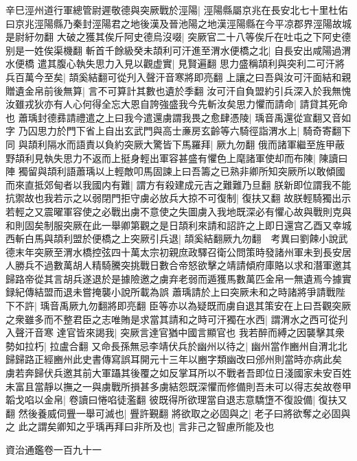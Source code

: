 辛巳涇州道行軍總管尉遲敬德與突厥戰於涇陽|{
	涇陽縣屬京兆在長安北七十里杜佑曰京兆涇陽縣乃秦封涇陽君之地後漢及晉池陽之地漢涇陽縣在今平凉郡界涇陽故城是尉紆勿翻}
大破之獲其俟斤阿史德烏沒啜|{
	突厥官二十八等俟斤在吐屯之下阿史德别是一姓俟渠機翻}
斬首千餘級癸未頡利可汗進至渭水便橋之北|{
	自長安出咸陽過渭水便橋}
遣其腹心執失思力入見以觀虚實|{
	見賢遍翻}
思力盛稱頡利與突利二可汗將兵百萬今至矣|{
	頡奚結翻可從刋入聲汗音寒將即亮翻}
上讓之曰吾與汝可汗面結和親贈遺金帛前後無算|{
	言不可算計其數也遺於季翻}
汝可汗自負盟約引兵深入於我無愧汝雖戎狄亦有人心何得全忘大恩自誇強盛我今先斬汝矣思力懼而請命|{
	請貸其死命也}
蕭瑀封德彞請禮遣之上曰我今遣還虜謂我畏之愈肆憑陵|{
	瑀音禹還從宣翻又音如字}
乃囚思力於門下省上自出玄武門與高士亷房玄齡等六騎徑詣渭水上|{
	騎奇寄翻下同}
與頡利隔水而語責以負約突厥大驚皆下馬羅拜|{
	厥九勿翻}
俄而諸軍繼至旌甲蔽野頡利見執失思力不返而上挺身輕出軍容甚盛有懼色上麾諸軍使却而布陳|{
	陳讀曰陣}
獨留與頡利語蕭瑀以上輕敵叩馬固諫上曰吾籌之已熟非卿所知突厥所以敢傾國而來直抵郊甸者以我國内有難|{
	謂方有殺建成元吉之難難乃旦翻}
朕新即位謂我不能抗禦故也我若示之以弱閉門拒守虜必放兵大掠不可復制|{
	復扶又翻}
故朕輕騎獨出示若輕之又震曜軍容使之必戰出虜不意使之失圖虜入我地既深必有懼心故與戰則克與和則固矣制服突厥在此一舉卿第觀之是日頡利來請和詔許之上即日還宫乙酉又幸城西斬白馬與頡利盟於便橋之上突厥引兵退|{
	頡奚結翻厥九勿翻　考異曰劉餗小說武德末年突厥至渭水橋控弦四十萬太宗初親庶政驛召衛公問策時發諸州軍未到長安居人勝兵不過數萬胡人精騎騰突挑戰日數合帝怒欲擊之靖請傾府庫賂以求和潛軍邀其歸路帝從其言胡兵遂退於是據險邀之虜弃老弱而遁獲馬數萬匹金帛一無遺焉今據實録紀傳結盟而退未嘗掩襲小說所載為誤}
蕭瑀請於上曰突厥未和之時諸將爭請戰陛下不許|{
	瑀音禹厥九勿翻將即亮翻}
臣等亦以為疑既而虜自退其策安在上曰吾觀突厥之衆雖多而不整君臣之志唯賄是求當其請和之時可汗獨在水西|{
	謂渭水之西可從刋入聲汗音寒}
達官皆來謁我|{
	突厥言達官猶中國言顯官也}
我若醉而縛之因襲擊其衆勢如拉朽|{
	拉盧合翻}
又命長孫無忌李靖伏兵於幽州以待之|{
	幽州當作豳州自渭北北歸歸路正經豳州此史書傳寫誤耳開元十三年以豳字類幽改曰邠州則當時亦病此矣}
虜若奔歸伏兵邀其前大軍躡其後覆之如反掌耳所以不戰者吾即位日淺國家未安百姓未富且當靜以撫之一與虜戰所損甚多虜結怨既深懼而修備則吾未可以得志矣故卷甲韜戈啗以金帛|{
	卷讀曰惓啗徒濫翻}
彼既得所欲理當自退志意驕墯不復設備|{
	復扶又翻}
然後養威伺舋一舉可滅也|{
	舋許覲翻}
將欲取之必固與之|{
	老子曰將欲奪之必固與之}
此之謂矣卿知之乎瑀再拜曰非所及也|{
	言非己之智慮所能及也}


資治通鑑卷一百九十一
